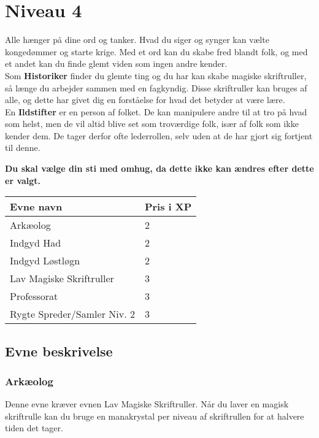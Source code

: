 \chapter*{Niveau 4}
Alle hænger på dine ord og tanker. Hvad du siger og synger kan vælte kongedømmer og starte krige. Med et ord kan du skabe fred blandt folk, og med et andet kan du finde glemt viden som ingen andre kender.\\
Som \textbf{Historiker} finder du glemte ting og du har kan skabe magiske skriftruller, så længe du arbejder sammen med en fagkyndig. Disse skriftruller kan bruges af alle, og dette har givet dig en forståelse for hvad det betyder at være lære.\\
En \textbf{Ildstifter} er en person af folket. De kan manipulere andre til at tro på hvad som helst, men de vil altid blive set som troværdige folk, især af folk som ikke kender dem. De tager derfor ofte lederrollen, selv uden at de har gjort sig fortjent til denne.

\textbf{Du skal vælge din sti med omhug, da dette ikke kan ændres efter dette er valgt.}\\


\begin{table}[H]
    \centering
    \begin{tabular}{|p{}|p{}|}
    \rowcolor{cerulean!80}\hline
        Evne navn & Pris i XP \\\hline
        Arkæolog & 2 \\\hline
        Indgyd Had& 2 \\\hline
        Indgyd Løstløgn& 2 \\\hline
        Lav Magiske Skriftruller & 3 \\\hline
        Professorat & 3 \\\hline
        Rygte Spreder/Samler Niv. 2 & 3\\\hline
    \end{tabular}
\end{table}

\section*{Evne beskrivelse}

\subsection*{Arkæolog}
Denne evne kræver evnen Lav Magiske Skriftruller. Når du laver en magisk skriftrulle kan du bruge en manakrystal per niveau af skriftrullen for at halvere tiden det tager. 

